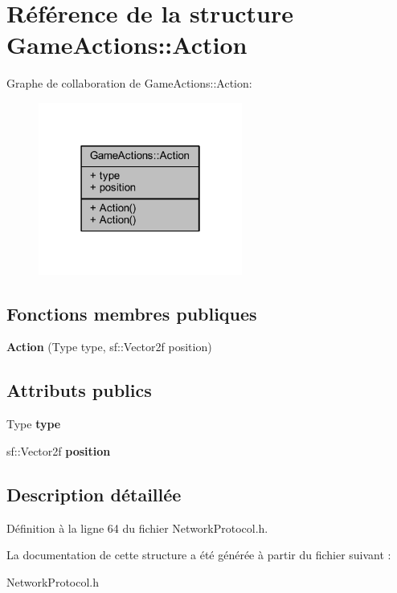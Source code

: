\hypertarget{struct_game_actions_1_1_action}{}\section{Référence de la structure Game\+Actions\+:\+:Action}
\label{struct_game_actions_1_1_action}


Graphe de collaboration de Game\+Actions\+:\+:Action\+:\nopagebreak
\begin{figure}[H]
\begin{center}
\leavevmode
\includegraphics[width=190pt]{struct_game_actions_1_1_action__coll__graph}
\end{center}
\end{figure}
\subsection*{Fonctions membres publiques}
\begin{DoxyCompactItemize}
\item 
\hypertarget{struct_game_actions_1_1_action_a4f99d636b15eb70c090574871bc6e5c6}{}\label{struct_game_actions_1_1_action_a4f99d636b15eb70c090574871bc6e5c6} 
{\bfseries Action} (Type type, sf\+::\+Vector2f position)
\end{DoxyCompactItemize}
\subsection*{Attributs publics}
\begin{DoxyCompactItemize}
\item 
\hypertarget{struct_game_actions_1_1_action_ac4b04fe7c91e9f47d55665d7272b4622}{}\label{struct_game_actions_1_1_action_ac4b04fe7c91e9f47d55665d7272b4622} 
Type {\bfseries type}
\item 
\hypertarget{struct_game_actions_1_1_action_ac6834c74b5e0b5db797e2226da4dc83f}{}\label{struct_game_actions_1_1_action_ac6834c74b5e0b5db797e2226da4dc83f} 
sf\+::\+Vector2f {\bfseries position}
\end{DoxyCompactItemize}


\subsection{Description détaillée}


Définition à la ligne 64 du fichier Network\+Protocol.\+h.



La documentation de cette structure a été générée à partir du fichier suivant \+:\begin{DoxyCompactItemize}
\item 
Network\+Protocol.\+h\end{DoxyCompactItemize}
